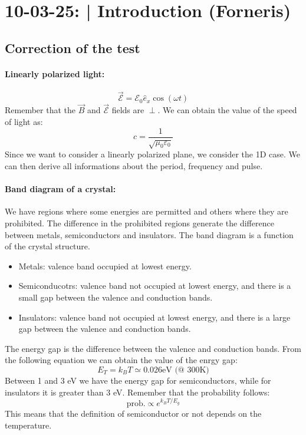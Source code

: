 \section{10-03-25: | Introduction (Forneris)}

\subsection{Correction of the test}

\paragraph{Linearly polarized light:} 
\begin{equation}
    \vec{\mathcal{E}} = \mathcal{E}_0 \hat{e}_x \cos(\omega t)
\end{equation}
Remember that the $\vec{B}$ and $\vec{\mathcal{E}}$ fields are $\perp$. We can obtain the value of the speed of light as:
\begin{equation}
    c = \frac{1}{\sqrt{\mu_0 \varepsilon_0}}
\end{equation}
Since we want to consider a linearly polarized plane, we consider the 1D case. We can then derive all informations about the period, frequency and pulse.

\paragraph{Band diagram of a crystal:} We have regions where some energies are permitted and others where they are prohibited. The difference in the prohibited regions generate the difference between metals, semiconductors and insulators. The band diagram is a function of the crystal structure.

\begin{itemize}
    \item Metals: valence band occupied at lowest energy.
    \item Semiconducotrs: valence band not occupied at lowest energy, and there is a small gap between the valence and conduction bands.
    \item Insulators: valence band not occupied at lowest energy, and there is a large gap between the valence and conduction bands.
\end{itemize}

\noindent The energy gap is the difference between the valence and conduction bands. From the following equation we can obtain the value of the enrgy gap:
\begin{equation}
    E_T = k_B T \simeq 0.026 \text{eV (@ 300K)} 
\end{equation}
Between 1 and 3 eV we have the energy gap for semiconductors, while for insulators it is greater than 3 eV. Remember that the probability follows:
\begin{equation}
    \text{prob.} \propto e^{k_BT / E_g}
\end{equation}
This means that the definition of semiconductor or not depends on the temperature.

